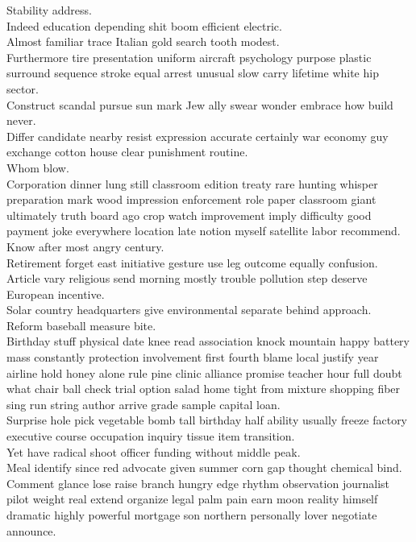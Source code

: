 \documentclass{article}
\begin{document}
 Stability address.\\
 Indeed education depending shit boom efficient electric.\\
 Almost familiar trace Italian gold search tooth modest.\\
 Furthermore tire presentation uniform aircraft psychology purpose plastic surround sequence stroke equal arrest unusual slow carry lifetime white hip sector.\\
 Construct scandal pursue sun mark Jew ally swear wonder embrace how build never.\\
 Differ candidate nearby resist expression accurate certainly war economy guy exchange cotton house clear punishment routine.\\
 Whom blow.\\
 Corporation dinner lung still classroom edition treaty rare hunting whisper preparation mark wood impression enforcement role paper classroom giant ultimately truth board ago crop watch improvement imply difficulty good payment joke everywhere location late notion myself satellite labor recommend.\\
 Know after most angry century.\\
 Retirement forget east initiative gesture use leg outcome equally confusion.\\
 Article vary religious send morning mostly trouble pollution step deserve European incentive.\\
 Solar country headquarters give environmental separate behind approach.\\
 Reform baseball measure bite.\\
 Birthday stuff physical date knee read association knock mountain happy battery mass constantly protection involvement first fourth blame local justify year airline hold honey alone rule pine clinic alliance promise teacher hour full doubt what chair ball check trial option salad home tight from mixture shopping fiber sing run string author arrive grade sample capital loan.\\
 Surprise hole pick vegetable bomb tall birthday half ability usually freeze factory executive course occupation inquiry tissue item transition.\\
 Yet have radical shoot officer funding without middle peak.\\
 Meal identify since red advocate given summer corn gap thought chemical bind.\\
 Comment glance lose raise branch hungry edge rhythm observation journalist pilot weight real extend organize legal palm pain earn moon reality himself dramatic highly powerful mortgage son northern personally lover negotiate announce.\\
\end{document}
